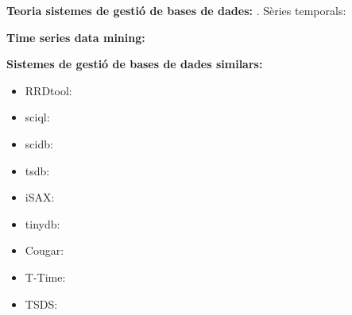 \documentclass[paper=a4,parskip=half,catalan]{scrartcl}
\begin{document}
\textbf{Teoria sistemes de gestió de bases de dades:}
\cite{date02:_tempor_data_relat_model,date:introduction,atzeni13:relational_model_dead}.
Sèries temporals: \cite{dreyer94,segev87:sigmod,bonnet01,jensen99:temporaldata}

\textbf{Time series data mining:}
\cite{deligiannakis07,last01,keogh02,fu11}



\textbf{Sistemes de gestió de bases de dades similars:}
\begin{itemize}
\item RRDtool: \cite{lisa98:oetiker,rrdtool}
\item sciql: \cite{sciql,zhang11,kersten11}
\item scidb: \cite{stonebraker09:scidb,scidb}
\item tsdb: \cite{deri12:tsdb_compressed_database}
\item iSAX: \cite{keogh10:isax,keogh08:isax}
\item tinydb: %
\item Cougar: %
\item T-Time: %
\item TSDS: %


\end{itemize}


\printbibliography
\end{document}
